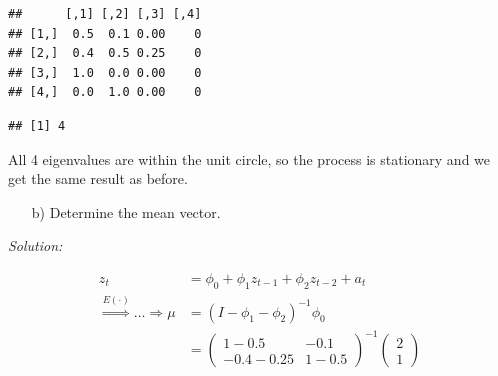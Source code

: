 \documentclass[12pt,a4paper]{article}
\newenvironment{Shaded}{\begin{snugshade}}{\end{snugshade}}
\newcommand{\CommentTok}[1]{\textcolor[rgb]{0.56,0.35,0.01}{\textit{#1}}}
\newcommand{\DecValTok}[1]{\textcolor[rgb]{0.00,0.00,0.81}{#1}}
\newcommand{\KeywordTok}[1]{\textcolor[rgb]{0.13,0.29,0.53}{\textbf{#1}}}
\newcommand{\NormalTok}[1]{#1}
\newcommand{\OperatorTok}[1]{\textcolor[rgb]{0.81,0.36,0.00}{\textbf{#1}}}
\newcommand{\StringTok}[1]{\textcolor[rgb]{0.31,0.60,0.02}{#1}}
\begin{document}
\begin{verbatim}
##      [,1] [,2] [,3] [,4]
## [1,]  0.5  0.1 0.00    0
## [2,]  0.4  0.5 0.25    0
## [3,]  1.0  0.0 0.00    0
## [4,]  0.0  1.0 0.00    0
\end{verbatim}

\begin{Shaded}
\end{Shaded}

\begin{verbatim}
## [1] 4
\end{verbatim}

All 4 eigenvalues are within the unit circle, so the process is
stationary and we get the same result as before.

\begin{itemize}
    \item[b)] Determine the mean vector.
\end{itemize}

\emph{Solution:}

\begin{align*}
  z_t & = \phi_0 + \phi_1 z_{t-1} + \phi_2 z_{t-2} +a_t\\
  \overset{E(\cdot)}{\Rightarrow} \ldots  \Rightarrow \mu & = \left( I - \phi_1 - \phi_2 \right)^{-1} \phi_0 \\  
  & = \begin{pmatrix}
  1 - 0.5 &  -0.1\\
  -0.4 - 0.25 & 1 - 0.5
  \end{pmatrix}^{-1}
   \begin{pmatrix}
  2\\
  1
  \end{pmatrix}
\end{align*}

\begin{Shaded}
\end{Shaded}
\end{document}
